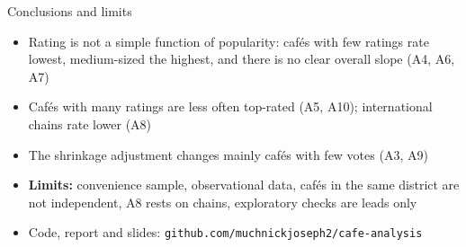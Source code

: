 \documentclass[aspectratio=169,11pt]{beamer}
\begin{document}
\begin{frame}{Conclusions and limits}
\begin{itemize}
  \item Rating is not a simple function of popularity: cafés with few ratings rate lowest, medium-sized the highest, and there is no clear overall slope (A4, A6, A7)
  \item Cafés with many ratings are less often top-rated (A5, A10); international chains rate lower (A8)
  \item The shrinkage adjustment changes mainly cafés with few votes (A3, A9)
  \item \textbf{Limits:} convenience sample, observational data, cafés in the same district are not independent, A8 rests on \NIntl{} chains, exploratory checks are leads only
  \item Code, report and slides: \texttt{github.com/muchnickjoseph2/cafe-analysis}
\end{itemize}
\end{frame}
\end{document}
